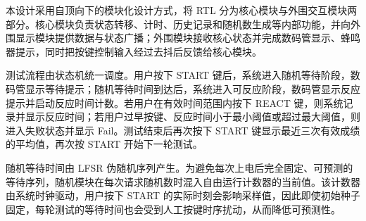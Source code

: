 


本设计采用自顶向下的模块化设计方式，将 RTL 分为核心模块与外围交互模块两部分。核心模块负责状态转移、计时、历史记录和随机数生成等内部功能，并向外围显示模块提供数据与状态广播；外围模块接收核心状态并完成数码管显示、蜂鸣器提示，同时把按键控制输入经过去抖后反馈给核心模块。

测试流程由状态机统一调度。用户按下 START 键后，系统进入随机等待阶段，数码管显示等待提示；随机等待时间到达后，系统进入可反应阶段，数码管显示反应提示并启动反应时间计数。若用户在有效时间范围内按下 REACT 键，则系统记录并显示反应时间；若用户过早按键、反应时间小于最小阈值或超过最大阈值，则进入失败状态并显示 Fail。测试结束后再次按下 START 键显示最近三次有效成绩的平均值，再次按 START 开始下一轮测试。

随机等待时间由 LFSR 伪随机序列产生。为避免每次上电后完全固定、可预测的等待序列，随机模块在每次请求随机数时混入自由运行计数器的当前值。该计数器由系统时钟驱动，用户按下 START 的实际时刻会影响采样值，因此即使初始种子固定，每轮测试的等待时间也会受到人工按键时序扰动，从而降低可预测性。





